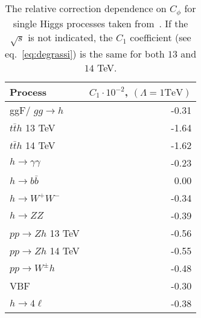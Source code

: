 \begin{table}[h]
\centering
\begin{tabular}{lr}
\toprule
Process&$C_1\cdot 10^{-2}$,  $(\Lambda=1 \mathrm{TeV} )$  \\
\midrule
ggF/ $gg\to h$   & -0.31 \\
$t\bar{t}h$   \textcolor{Mahogany}{13 TeV}   & -1.64 \\
$t\bar{t}h$   \textcolor{Mahogany}{14 TeV}   & -1.62 \\
$h\to \gamma \gamma$   & -0.23 \\
$h\to b\bar{b}$ & 0.00  \\
$h\to W^+ W^-$  & -0.34 \\
$h\to Z Z$      & -0.39 \\
$pp\to Zh$   \textcolor{Mahogany}{13 TeV}    & -0.56 \\
$pp\to Zh$    \textcolor{Mahogany}{14 TeV}    & -0.55 \\
$pp\to W^\pm h$  & -0.48 \\
VBF              & -0.30 \\
$ h \to 4 \ell$              & -0.38 \\
\bottomrule
\end{tabular}
\caption{The relative correction dependence on $C_\phi$ for single Higgs processes taken from~\cite{ Degrassi:2021uik}. If the $\sqrt{s}$ is not indicated, the $C_1$ coefficient (see eq.~\eqref{eq:degrassi}) is the same for both $13$ and $14$ TeV. }
\label{table:resch}
\end{table}
